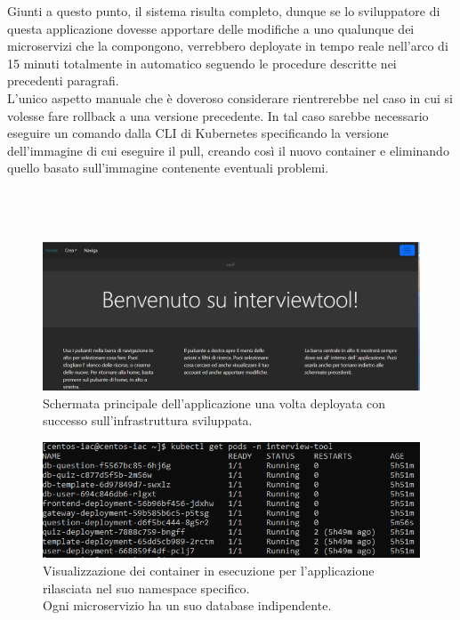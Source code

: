 \documentclass[a4paper,12pt]{report}
\begin{document}
Giunti a questo punto, il sistema risulta completo, dunque se lo sviluppatore di questa applicazione dovesse apportare delle modifiche a uno qualunque dei microservizi che la compongono, verrebbero deployate in tempo reale nell'arco di 15 minuti totalmente in automatico seguendo le procedure descritte nei precedenti paragrafi. \\
L'unico aspetto manuale che è doveroso considerare rientrerebbe nel caso in cui si volesse fare rollback a una versione precedente. In tal caso sarebbe necessario eseguire un comando dalla CLI di Kubernetes specificando la versione dell'immagine di cui eseguire il pull, creando così il nuovo container e eliminando quello basato sull'immagine contenente eventuali problemi. \\ \\ \\ \\ 


\begin{figure}[h]
	\includegraphics[width=1.0\textwidth]{app_micro}
    \caption{Schermata principale dell'applicazione una volta deployata con successo sull'infrastruttura sviluppata.}
    \label{fig:app_micro}
\end{figure}

\begin{figure}[h]
	\includegraphics[width=1.0\textwidth]{app_micro2}
    \caption{Visualizzazione dei container in esecuzione per l'applicazione rilasciata nel suo namespace specifico. \\Ogni microservizio ha un suo database indipendente.}
    \label{fig:app_micro2}
\end{figure}
\end{document}
